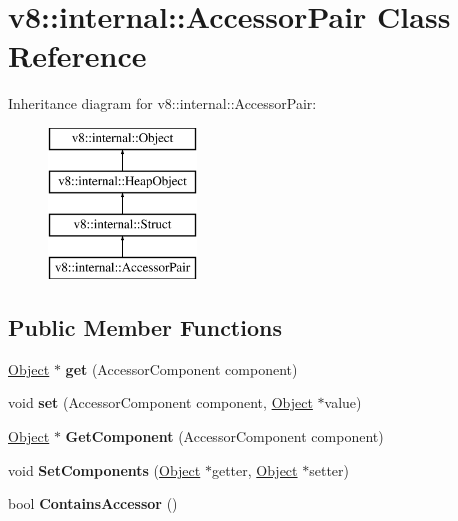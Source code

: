 \hypertarget{classv8_1_1internal_1_1_accessor_pair}{}\section{v8\+:\+:internal\+:\+:Accessor\+Pair Class Reference}
\label{classv8_1_1internal_1_1_accessor_pair}
Inheritance diagram for v8\+:\+:internal\+:\+:Accessor\+Pair\+:\begin{figure}[H]
\begin{center}
\leavevmode
\includegraphics[height=4.000000cm]{classv8_1_1internal_1_1_accessor_pair}
\end{center}
\end{figure}
\subsection*{Public Member Functions}
\begin{DoxyCompactItemize}
\item 
\hypertarget{classv8_1_1internal_1_1_accessor_pair_acbfdc7c28139840e1a2e41a49a66e4e6}{}\hyperlink{classv8_1_1internal_1_1_object}{Object} $\ast$ {\bfseries get} (Accessor\+Component component)\label{classv8_1_1internal_1_1_accessor_pair_acbfdc7c28139840e1a2e41a49a66e4e6}

\item 
\hypertarget{classv8_1_1internal_1_1_accessor_pair_ad2a9c19f26306e325c88a48431f1f2c1}{}void {\bfseries set} (Accessor\+Component component, \hyperlink{classv8_1_1internal_1_1_object}{Object} $\ast$value)\label{classv8_1_1internal_1_1_accessor_pair_ad2a9c19f26306e325c88a48431f1f2c1}

\item 
\hypertarget{classv8_1_1internal_1_1_accessor_pair_a5f990eda86ea9c93400f176be34e2871}{}\hyperlink{classv8_1_1internal_1_1_object}{Object} $\ast$ {\bfseries Get\+Component} (Accessor\+Component component)\label{classv8_1_1internal_1_1_accessor_pair_a5f990eda86ea9c93400f176be34e2871}

\item 
\hypertarget{classv8_1_1internal_1_1_accessor_pair_a6e5a2de9676c59e75ff73635f152a27d}{}void {\bfseries Set\+Components} (\hyperlink{classv8_1_1internal_1_1_object}{Object} $\ast$getter, \hyperlink{classv8_1_1internal_1_1_object}{Object} $\ast$setter)\label{classv8_1_1internal_1_1_accessor_pair_a6e5a2de9676c59e75ff73635f152a27d}

\item 
\hypertarget{classv8_1_1internal_1_1_accessor_pair_a3776e1f65c6612d9cb544747211bd3f0}{}bool {\bfseries Contains\+Accessor} ()\label{classv8_1_1internal_1_1_accessor_pair_a3776e1f65c6612d9cb544747211bd3f0}

\end{DoxyCompactItemize}
